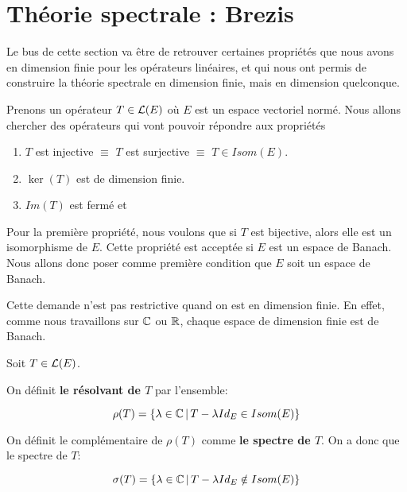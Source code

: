 \section{Théorie spectrale : Brezis}

Le bus de cette section va être de retrouver certaines propriétés que nous avons
en dimension finie pour les opérateurs linéaires, et qui nous ont permis de
construire la théorie spectrale en dimension finie, mais en dimension
quelconque.

Prenons un opérateur $T \in \mathcal{L}(E)$ où $E$ est un espace vectoriel
normé.  Nous allons chercher des opérateurs qui vont pouvoir répondre aux
propriétés

\begin{enumerate}
	\item $T$ est injective $\equiv$ $T$ est surjective $\equiv$ $T \in
		Isom(E)$.
	\item $\ker(T)$ est de dimension finie.
	\item $Im(T)$ est fermé et 
\end{enumerate}

Pour la première propriété, nous voulons que si $T$ est bijective, alors elle
est un isomorphisme de $E$. Cette propriété est acceptée si $E$ est un espace de
Banach. Nous allons donc poser comme première condition que $E$ soit un espace
de Banach.

Cette demande n'est pas restrictive quand on est en dimension finie. En effet,
comme nous travaillons sur $\mathbb{C}$ ou $\mathbb{R}$, chaque espace de dimension
finie est de Banach.

\begin{definition}
	Soit $T \in \mathcal{L}(E)$.

	On définit \textbf{le résolvant de $T$} par l'ensemble:

	\begin{equation}
		\rho(T) = \left\{\lambda \in \mathbb{C} \, | \, T - \lambda
			{Id}_{E} \in Isom(E) \right\}
			\label{def:resolvant_operator}
	\end{equation}

	On définit le complémentaire de $\rho(T)$ comme \textbf{le spectre de $T$}.
	On a donc que le spectre de $T$:

	\begin{equation}
		\sigma(T) = \left\{\lambda \in \mathbb{C} \, | \, T - \lambda {Id}_{E}
		\notin Isom(E) \right\}
		\label{def:spectrum_operator}
	\end{equation}
\end{definition}


